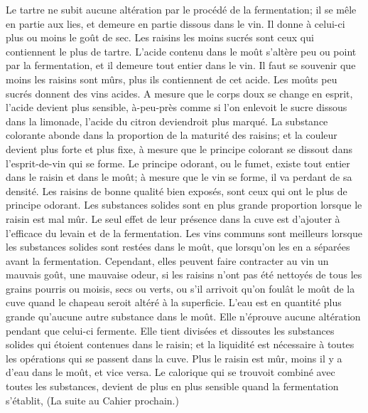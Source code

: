 Le tartre ne subit aucune altération par le procédé de la fermentation; il se mêle\setcounter{page}{95} en partie aux lies, et demeure en partie dissous dans le vin. Il donne à celui-ci plus ou moins le goût de sec. Les raisins les moins sucrés sont ceux qui contiennent le plus de tartre.
L'acide contenu dans le moût s'altère peu ou point par la fermentation, et il demeure tout entier dans le vin. Il faut se souvenir que moins les raisins sont mûrs, plus ils contiennent de cet acide. Les moûts peu sucrés donnent des vins acides. A mesure que le corps doux se change en esprit, l'acide devient plus sensible, à-peu-près comme si l'on enlevoit le sucre dissous dans la limonade, l'acide du citron deviendroit plus marqué. La substance colorante abonde dans la proportion de la maturité des raisins; et la couleur devient plus forte et plus fixe, à mesure que le principe colorant se dissout dans l'esprit-de-vin qui se forme.
Le principe odorant, ou le fumet, existe tout entier dans le raisin et dans le moût; à mesure que le vin se forme, il va perdant de sa densité. Les raisins de bonne qualité bien exposés, sont ceux qui ont le plus de principe odorant.
Les substances solides sont en plus grande proportion lorsque le raisin est mal mûr. Le seul effet de leur présence dans la cuve est\setcounter{page}{96} d'ajouter à l'efficace du levain et de la fermentation. Les vins communs sont meilleurs lorsque les substances solides sont restées dans le moût, que lorsqu'on les en a séparées avant la fermentation. Cependant, elles peuvent faire contracter au vin un mauvais goût, une mauvaise odeur, si les raisins n'ont pas été nettoyés de tous les grains pourris ou moisis, secs ou verts, ou s'il arrivoit qu'on foulât le moût de la cuve quand le chapeau seroit altéré à la superficie.
L'eau est en quantité plus grande qu'aucune autre substance dans le moût. Elle n'éprouve aucune altération pendant que celui-ci fermente. Elle tient divisées et dissoutes les substances solides qui étoient contenues dans le raisin; et la liquidité est nécessaire à toutes les opérations qui se passent dans la cuve.
Plus le raisin est mûr, moins il y a d'eau dans le moût, et vice versa.
Le calorique qui se trouvoit combiné avec toutes les substances, devient de plus en plus sensible quand la fermentation s'établit,
(La suite au Cahier prochain.)